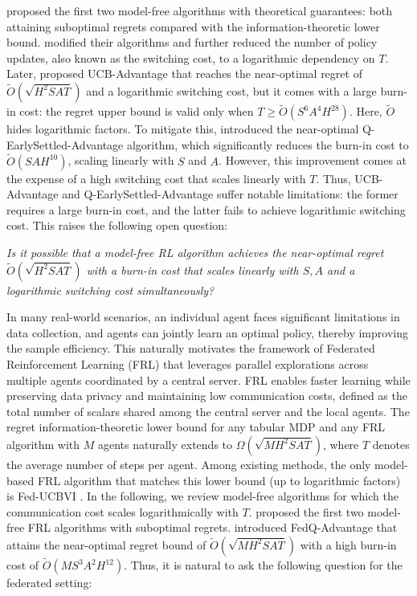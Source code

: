 \documentclass{article}
\begin{document}
\cite{jin2018q} proposed the first two model-free algorithms with theoretical guarantees: both attaining suboptimal regrets compared with the information-theoretic lower bound. \cite{bai2019provably} modified their algorithms and further reduced the number of policy updates, also known as the switching cost, to a logarithmic dependency on $T$. Later, \cite{zhang2020almost} proposed UCB-Advantage that reaches the near-optimal regret of $\tilde{O}(\sqrt{H^2SAT})$ and a logarithmic switching cost, but it comes with a large burn-in cost: the regret upper bound is valid only when $T\geq \tilde{O}(S^6A^4H^{28})$. Here, $\tilde{O}$ hides logarithmic factors. To mitigate this, \cite{li2023breaking} introduced the near-optimal Q-EarlySettled-Advantage algorithm, which significantly reduces the burn-in cost to $\tilde{O}(SAH^{10})$, scaling linearly with $S$ and $A$. However, this improvement comes at the expense of a high switching cost that scales linearly with $T$. Thus, UCB-Advantage and Q-EarlySettled-Advantage suffer notable limitations: the former requires a large burn-in cost, and the latter fails to achieve logarithmic switching cost. This raises the following open question:
\begin{center}
    \textit{Is it possible that a model-free RL algorithm achieves the near-optimal regret $\tilde{O}(\sqrt{H^2SAT})$ with a burn-in cost that scales linearly with $S, A$ and a logarithmic switching cost simultaneously?}
\end{center}
In many real-world scenarios, an individual agent faces significant limitations in data collection,
and agents can jointly learn an optimal policy, thereby improving the sample efficiency. This naturally motivates the framework of Federated Reinforcement Learning (FRL) that leverages parallel explorations across multiple agents coordinated by a central server. FRL enables faster learning while preserving data privacy and maintaining low communication costs, defined as the total number of scalars shared among the central server and the local agents. The regret information-theoretic lower bound for any tabular MDP and any FRL algorithm with $M$ agents naturally extends to $\Omega(\sqrt{MH^2SAT})$, where $T$ denotes the average number of steps per agent. Among existing methods, the only model-based FRL algorithm that matches this lower bound (up to logarithmic factors) is Fed-UCBVI \citep{labbi2024federated}. In the following, we review model-free algorithms for which the communication cost scales logarithmically with $T$. \cite{zheng2023federated} proposed the first two model-free FRL algorithms with suboptimal regrets. \cite{zheng2024federated} introduced FedQ-Advantage that attains the near-optimal regret bound of $\tilde{O}(\sqrt{MH^2 S A T})$ with a high burn-in cost of $\tilde{O}(M S^3 A^2 H^{12})$. Thus, it is natural to ask the following question for the federated setting:
\end{document}
